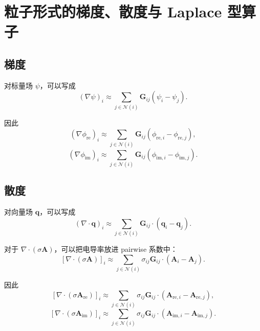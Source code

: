 \documentclass[UTF8,11pt]{ctexart}
\begin{document}
\section{粒子形式的梯度、散度与 Laplace 型算子}

\subsection{梯度}

对标量场 $\psi$，可以写成
\begin{equation}
    (\nabla\psi)_i
    \approx
    \sum_{j\in\mathcal{N}(i)}
    \bm G_{ij}
    \left(
        \psi_i - \psi_j
    \right).
    \label{eq:grad-scalar}
\end{equation}

因此
\begin{equation}
    (\nabla\phi_{\mathrm{re}})_i
    \approx
    \sum_{j\in\mathcal{N}(i)}
    \bm G_{ij}
    \left(
        \phi_{\mathrm{re},i}
        -
        \phi_{\mathrm{re},j}
    \right),
\end{equation}
\begin{equation}
    (\nabla\phi_{\mathrm{im}})_i
    \approx
    \sum_{j\in\mathcal{N}(i)}
    \bm G_{ij}
    \left(
        \phi_{\mathrm{im},i}
        -
        \phi_{\mathrm{im},j}
    \right).
\end{equation}

\subsection{散度}

对向量场 $\bm q$，可以写成
\begin{equation}
    (\nabla\cdot\bm q)_i
    \approx
    \sum_{j\in\mathcal{N}(i)}
    \bm G_{ij}\cdot
    \left(
        \bm q_i - \bm q_j
    \right).
    \label{eq:div-vector}
\end{equation}

对于 $\nabla\cdot(\sigma\bm A)$，可以把电导率放进 pairwise 系数中：
\begin{equation}
    \left[\nabla\cdot(\sigma\bm A)\right]_i
    \approx
    \sum_{j\in\mathcal{N}(i)}
    \sigma_{ij}\bm G_{ij}\cdot
    \left(
        \bm A_i - \bm A_j
    \right).
    \label{eq:div-sigma-a}
\end{equation}

因此
\begin{equation}
    \left[\nabla\cdot(\sigma\bm A_{\mathrm{re}})\right]_i
    \approx
    \sum_{j\in\mathcal{N}(i)}
    \sigma_{ij}\bm G_{ij}\cdot
    \left(
        \bm A_{\mathrm{re},i}
        -
        \bm A_{\mathrm{re},j}
    \right),
\end{equation}
\begin{equation}
    \left[\nabla\cdot(\sigma\bm A_{\mathrm{im}})\right]_i
    \approx
    \sum_{j\in\mathcal{N}(i)}
    \sigma_{ij}\bm G_{ij}\cdot
    \left(
        \bm A_{\mathrm{im},i}
        -
        \bm A_{\mathrm{im},j}
    \right).
\end{equation}
\end{document}
